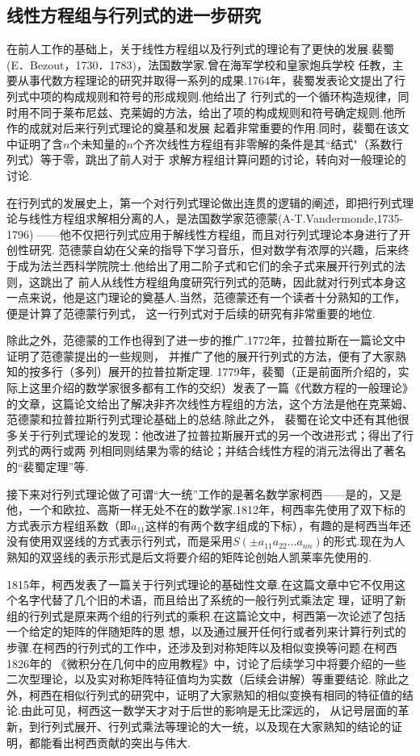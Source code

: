 \subsection{线性方程组与行列式的进一步研究}
在前人工作的基础上，关于线性方程组以及行列式的理论有了更快的发展.裴蜀(E．Bezout，1730．1783)，法国数学家.曾在海军学校和皇家炮兵学校
任教，主要从事代数方程理论的研究并取得一系列的成果.1764年，裴蜀发表论文提出了行列式中项的构成规则和符号的形成规则.他给出了
行列式的一个循环构造规律，同时用不同于莱布尼兹、克莱姆的方法，给出了项的构成规则和符号确定规则.他所作的成就对后来行列式理论的奠基和发展
起着非常重要的作用.同时，裴蜀在该文中证明了含$n$个未知量的$n$个齐次线性方程组有非零解的条件是其“结式"（系数行列式）等于零，跳出了前人对于
求解方程组计算问题的讨论，转向对一般理论的讨论.

在行列式的发展史上，第一个对行列式理论做出连贯的逻辑的阐述，即把行列式理论与线性方程组求解相分离的人，是法国数学家范德蒙(A-T.Vandermonde,1735-1796)
——他不仅把行列式应用于解线性方程组，而且对行列式理论本身进行了开创性研究.
范德蒙自幼在父亲的指导下学习音乐，但对数学有浓厚的兴趣，后来终于成为法兰西科学院院士.他给出了用二阶子式和它们的余子式来展开行列式的法则，这跳出了
前人从线性方程组角度研究行列式的范畴，因此就对行列式本身这一点来说，他是这门理论的奠基人.当然，范德蒙还有一个读者十分熟知的工作，便是计算了范德蒙行列式，
这一行列式对于后续的研究有非常重要的地位.

除此之外，范德蒙的工作也得到了进一步的推广.1772年，拉普拉斯在一篇论文中证明了范德蒙提出的一些规则，
并推广了他的展开行列式的方法，便有了大家熟知的按多行（多列）展开的拉普拉斯定理.
1779年，裴蜀（正是前面所介绍的，实际上这里介绍的数学家很多都有工作的交织）发表了一篇《代数方程的一般理论》
的文章，这篇论文给出了解决非齐次线性方程组的方法，这个方法是他在克莱姆、范德蒙和拉普拉斯行列式理论基础上的总结.除此之外，
裴蜀在论文中还有其他很多关于行列式理论的发现：他改进了拉普拉斯展开式的另一个改进形式；得出了行列式的两行或两
列相同则结果为零的结论；并结合线性方程的消元法得出了著名的``裴蜀定理''等.

接下来对行列式理论做了可谓``大一统''工作的是著名数学家柯西——是的，又是他，一个和欧拉、高斯一样无处不在的数学家.1812年，柯西率先使用了双下标的方式表示方程组系数（即$a_{11}$这样的有两个数字组成的下标），有趣的是柯西当年还没有使用双竖线的方式表示行列式，而是采用$S(\pm a_{11}a_{22}\ldots a_{nn})$的形式.现在为人熟知的双竖线的表示形式是后文将要介绍的矩阵论创始人凯莱率先使用的.

1815年，柯西发表了一篇关于行列式理论的基础性文章.在这篇文章中它不仅用这个名字代替了几个旧的术语，而且给出了系统的一般行列式乘法定
理，证明了新组的行列式是原来两个组的行列式的乘积.在这篇论文中，柯西第一次论述了包括一个给定的矩阵的伴随矩阵的思
想，以及通过展开任何行或者列来计算行列式的步骤.在柯西的行列式的工作中，还涉及到对称矩阵以及相似变换等问题.在柯西1826年的
《微积分在几何中的应用教程》中，讨论了后续学习中将要介绍的一些二次型理论，以及实对称矩阵特征值均为实数（后续会讲解）等重要结论.
除此之外，柯西在相似行列式的研究中，证明了大家熟知的相似变换有相同的特征值的结论.由此可见，柯西这一数学天才对于后世的影响是无比深远的，
从记号层面的革新，到行列式展开、行列式乘法等理论的大一统，以及现在大家熟知的结论的证明，都能看出柯西贡献的突出与伟大.

